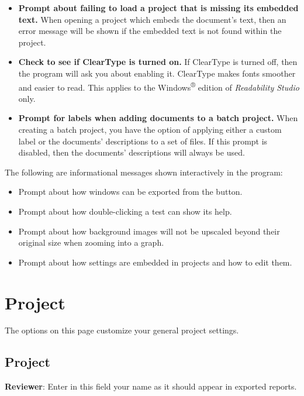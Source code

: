 \documentclass[
]{book}
\providecommand{\tightlist}{%
  \setlength{\itemsep}{0pt}\setlength{\parskip}{0pt}}
\theoremstyle{definition}
\theoremstyle{definition}
\theoremstyle{definition}
\theoremstyle{definition}
\theoremstyle{remark}
\begin{document}
\begin{itemize}
\item
  \textbf{Prompt about failing to load a project that is missing its embedded text.} When opening a project which embeds the document's text, then an error message will be shown if the embedded text is not found within the project.
\item
  \textbf{Check to see if ClearType is turned on.} If ClearType is turned off, then the program will ask you about enabling it. ClearType makes fonts smoother and easier to read. This applies to the Windows\textsuperscript{®} edition of \emph{Readability Studio} only.
\item
  \textbf{Prompt for labels when adding documents to a batch project.} When creating a batch project, you have the option of applying either a custom label or the documents' descriptions to a set of files. If this prompt is disabled, then the documents' descriptions will always be used.
\end{itemize}

The following are informational messages shown interactively in the program:

\begin{itemize}
\tightlist
\item
  Prompt about how windows can be exported from the  button.
\item
  Prompt about how double-clicking a test can show its help.
\item
  Prompt about how background images will not be upscaled beyond their original size when zooming into a graph.
\item
  Prompt about how settings are embedded in projects and how to edit them.
\end{itemize}

\newpage

\hypertarget{project-settings}{%
\section{Project}\label{project-settings}}

The options on this page customize your general project settings.

\hypertarget{project}{%
\subsection*{Project}\label{project}}

\textbf{Reviewer}: Enter in this field your name as it should appear in exported reports.
\end{document}
